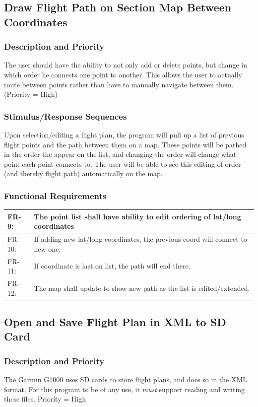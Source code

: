 \documentclass[12pt, letterpaper]{article}
\begin{document}
      \subsection{Draw Flight Path on Section Map Between Coordinates}
        \subsubsection{Description and Priority}
        		The user should have the ability to not only add or delete points, but change in which
        		order he connects one point to another. This allows the user to actually route between
        		points rather than have to manually navigate between them. (Priority = High)
        \subsubsection{Stimulus/Response Sequences}
            Upon selection/editing a flight plan, the program will pull up a list of previous flight
            points and the path between them on a map. These points will be pathed in the order the
            appear on the list, and changing the order will change what point each point connects to.
            The user will be able to see this editing of order (and thereby flight path) automatically
            on the map.
        \subsubsection{Functional Requirements}
          \begin{tabularx}{\textwidth}{|l|X|} \hline
            FR-9: & The point list shall have ability to edit ordering of lat/long coordinates\\ \hline
            FR-10: & If adding new lat/long coordinates, the previous coord will connect to new one.\\ \hline
            FR-11: & If coordinate is last on list, the path will end there.\\ \hline
      	    FR-12: & The map shall update to show new path as the list is edited/extended.\\ \hline
          \end{tabularx}
        \subsection{Open and Save Flight Plan in XML to SD Card}
          \subsubsection{Description and Priority}
            The Garmin G1000 uses SD cards to store flight plans, and does so in the XML format.
            For this program to be of any use, it \emph{must} support reading and writing these files.
            Priority = High
\end{document}
